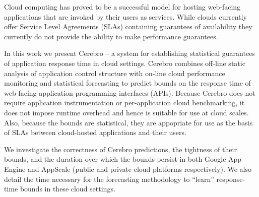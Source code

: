 Cloud computing has proved to be a successful model for hosting web-facing
applications that are invoked by their users as services.  While clouds
currently offer Service Level Agreements (SLAs) containing guarantees of
availability they currently do not provide the ability to make performance
guarantees.

In this work we present Cerebro -- a system for establishing statistical
guarantees of application response time in cloud settings.  Cerebro combines
off-line static analysis of application control structure with on-line cloud
performance monitoring and statistical forecasting to predict bounds on the
response time of web-facing application programming interfaces (APIs).
Because Cerebro does not require application instrumentation or 
per-application cloud benchmarking, it does not impose runtime overhead
and hence is suitable for use at cloud scales.  Also, because the bounds are
statistical, they are appopriate for use as the basis of SLAs between
cloud-hosted applications and their users.

We investigate the correctness of Cerebro predictions, the tightness of their
bounds, and the duration over which the bounds persist in both Google App
Engine and AppScale (public and private cloud platforms respectively).  
We also detail the time necessary for the forecasting 
methodology to ``learn'' response-time bounds in these cloud settings. 


